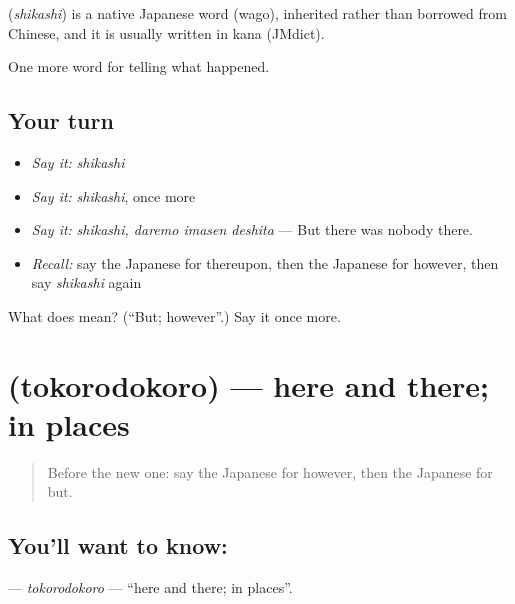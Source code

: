 \begin{cousinweb}
\textbf{} (\emph{shikashi}) is a native Japanese word (wago), inherited rather than borrowed from Chinese, and it is usually written in kana (JMdict).
\end{cousinweb}

\begin{grammarlens}[title={What you've built}]
One more word for telling what happened.
\end{grammarlens}

\subsection*{Your turn}
\begin{itemize}
\raggedright
  \item \emph{Say it:} \emph{shikashi}
  \item \emph{Say it:} \emph{shikashi}, once more
  \item \emph{Say it:} \emph{shikashi, daremo imasen deshita} — But there was nobody there.
  \item \emph{Recall:} say the Japanese for thereupon, then the Japanese for however, then say \emph{shikashi} again
\end{itemize}

\begin{tcolorbox}[breakable,colback=teal!4,colframe=teal!35!black,title={Before you move on}]
What does  mean? (\textquotedblleft{}But; however\textquotedblright{}.) Say it once more.
\end{tcolorbox}
\section[\texorpdfstring{\ja{ところどころ} (tokorodokoro)}{ところどころ (tokorodokoro)}]{ (tokorodokoro) — here and there; in places}

\label{lesson:JA-C315-tokorodokoro}



\begin{quote}
Before the new one: say the Japanese for however, then the Japanese for but.
\end{quote}

\subsection*{You'll want to know: }
\textbf{} — \emph{tokorodokoro} — \textquotedblleft{}here and there; in places\textquotedblright{}.

